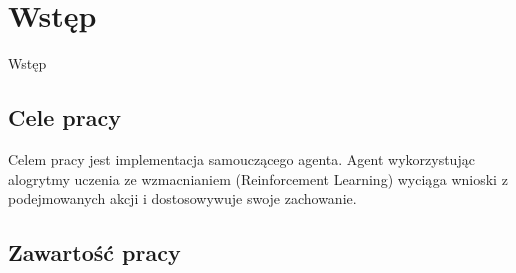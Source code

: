 \chapter{Wstęp}
\label{cha:wstep}

Wstęp

\section{Cele pracy}
\label{sec:celePracy}

Celem pracy jest implementacja samouczącego agenta. Agent wykorzystując alogrytmy uczenia ze wzmacnianiem (Reinforcement Learning) wyciąga wnioski z podejmowanych akcji 
i dostosowywuje swoje zachowanie. 



\section{Zawartość pracy}
\label{sec:zawartoscPracy}















